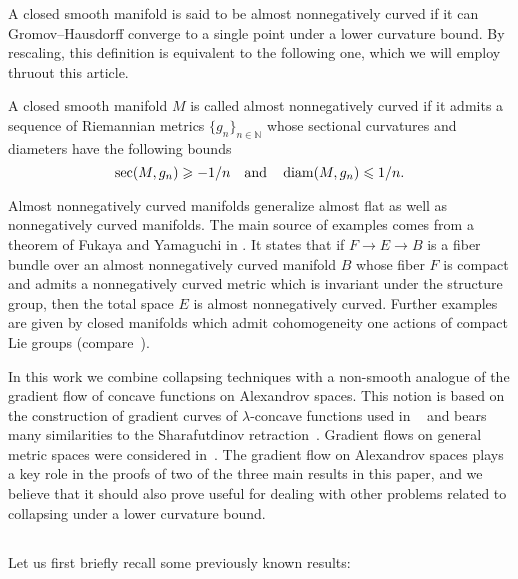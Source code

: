 \documentclass{amsart}
\begin{document}
A closed smooth manifold is  said
to be almost nonnegatively curved
if
it can Gromov--Hausdorff converge to a single point
under a lower curvature bound.
By rescaling, this definition is equivalent to the following one,
which we will employ thruout this article.

\begin{defn}
A closed smooth manifold $M$ is called almost nonnegatively curved
if it admits a sequence of Riemannian metrics $\{g_n\}_{n\in\mathbb{N}}$
whose sectional curvatures and diameters have the following bounds
$$\sec(M,g_n)\geqslant -1/n\quad\text{and}\quad\operatorname{\rm diam}(M,g_n)\leqslant 1/n.$$
\end{defn}

Almost nonnegatively curved manifolds
generalize almost flat as well as nonnegatively
curved manifolds.
The main source of examples
comes from a theorem of Fukaya and Yamaguchi in \cite{FY}.
It states that
if $F\to E\to B$ is a fiber bundle
over an almost nonnegatively curved manifold $B$
whose fiber $F$ is compact
and admits a nonnegatively curved metric 
which is invariant under the
structure group, 
then the total space $E$ is almost nonnegatively curved.
Further examples are given by closed manifolds which admit
cohomogeneity one actions of
compact Lie groups %
(compare~\cite{ST}).


In this work we combine collapsing techniques with a non-smooth analogue of the gradient flow of concave functions on Alexandrov spaces.
This notion is based  on the construction  of gradient curves of $\lambda$-concave functions used in ~\cite{PP} and bears many similarities to the Sharafutdinov retraction~\cite{Shar}.
Gradient flows on general metric spaces were considered in~\cite{grad-flow-book}.
The gradient flow on Alexandrov spaces plays a key role in the proofs of two of the three main results in this paper, and we believe that it should also prove useful for dealing with other problems related to collapsing under a lower curvature bound.

\subsection{} Let us first briefly recall some  previously known results:
\end{document}
